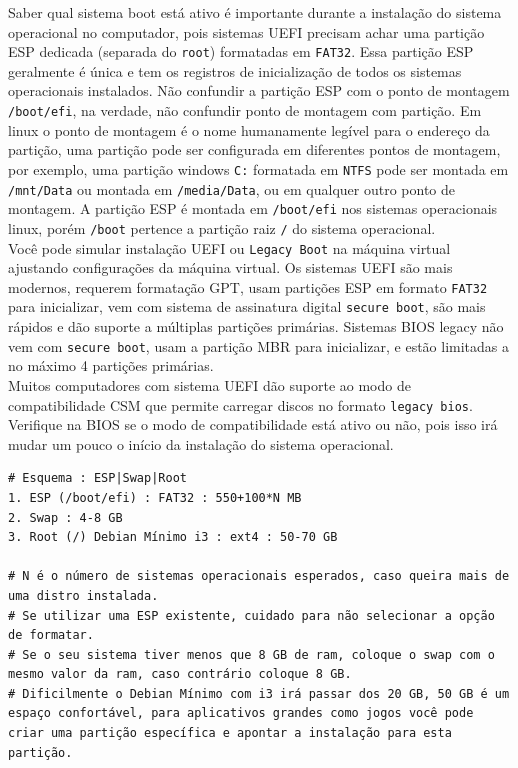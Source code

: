 \documentclass[12pt,a4paper]{article}
\begin{document}
\vspace{\baselineskip}

Saber qual sistema boot está ativo é importante durante a instalação do sistema operacional no computador, pois sistemas UEFI precisam achar uma partição ESP dedicada (separada do \texttt{root}) formatadas em \texttt{FAT32}. Essa partição ESP geralmente é única e tem os registros de inicialização de todos os sistemas operacionais instalados. Não confundir a partição ESP com o ponto de montagem \texttt{/boot/efi}, na verdade, não confundir ponto de montagem com partição. Em linux o ponto de montagem é o nome humanamente legível para o endereço da partição, uma partição pode ser configurada em diferentes pontos de montagem, por exemplo, uma partição windows \texttt{C:} formatada em \texttt{NTFS} pode ser montada em \texttt{/mnt/Data} ou montada em \texttt{/media/Data}, ou em qualquer outro ponto de montagem. A partição ESP é montada em \texttt{/boot/efi} nos sistemas operacionais linux, porém \texttt{/boot} pertence a partição raiz \texttt{/} do sistema operacional. \\

Você pode simular instalação UEFI ou \texttt{Legacy Boot} na máquina virtual ajustando configurações da máquina virtual. Os sistemas UEFI são mais modernos, requerem formatação GPT, usam partições ESP em formato \texttt{FAT32} para inicializar, vem com sistema de assinatura digital \texttt{secure boot}, são mais rápidos e dão suporte a múltiplas partições primárias. Sistemas BIOS legacy não vem com \texttt{secure boot}, usam a partição MBR para inicializar, e estão limitadas a no máximo 4 partições primárias.\\

Muitos computadores com sistema UEFI dão suporte ao modo de compatibilidade CSM que permite carregar discos no formato \texttt{legacy bios}. Verifique na BIOS se o modo de compatibilidade está ativo ou não, pois isso irá mudar um pouco o início da instalação do sistema operacional. \\

\begin{lstlisting}
# Esquema : ESP|Swap|Root
1. ESP (/boot/efi) : FAT32 : 550+100*N MB 
2. Swap : 4-8 GB 
3. Root (/) Debian Mínimo i3 : ext4 : 50-70 GB 

# N é o número de sistemas operacionais esperados, caso queira mais de uma distro instalada.
# Se utilizar uma ESP existente, cuidado para não selecionar a opção de formatar.
# Se o seu sistema tiver menos que 8 GB de ram, coloque o swap com o mesmo valor da ram, caso contrário coloque 8 GB. 
# Dificilmente o Debian Mínimo com i3 irá passar dos 20 GB, 50 GB é um espaço confortável, para aplicativos grandes como jogos você pode criar uma partição específica e apontar a instalação para esta partição.
\end{lstlisting}
\end{document}
